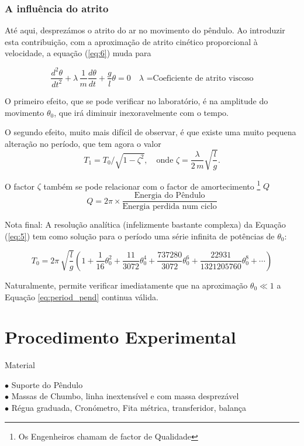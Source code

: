\documentclass[a4paper,twoside,12pt]{article}      %
\begin{document}
\subsubsection{A influência do atrito}
Até aqui, desprezámos o atrito do ar no movimento do pêndulo. Ao introduzir esta contribuição, com a aproximação de atrito cinético 
proporcional à velocidade, a  equação	(\ref{eq:6}) muda para

\begin{equation}
	 \frac{d^2 \theta}{dt^2} + \lambda \, \frac{1}{m}  \frac{d \theta}{dt} + \frac{g}{l} \theta =0 \quad \lambda \text{ =Coeficiente de atrito viscoso}
\end{equation}

O primeiro efeito, que se pode verificar no laboratório, é na amplitude do movimento $\theta_0$, que irá diminuir inexoravelmente com o tempo. 

O segundo efeito, muito mais difícil de observar, é que existe uma muito pequena alteração no período, que tem agora o valor
\begin{equation}
T_1= T_0 / \sqrt{1 - \zeta^2}, \quad \text{onde }  \zeta = \frac{\lambda}{2\, m} \sqrt{\frac{l}{g}} .
\end{equation}



O factor  $ \zeta $ também se pode relacionar com o factor de amortecimento \footnote{Os Engenheiros chamam de factor de Qualidade} $Q$ 
\begin{equation}
Q = 2 \pi \times \frac{\text{Energia do Pêndulo}}{\text{Energia perdida num ciclo}}
\end{equation}

Nota final: 
A resolução analítica (infelizmente bastante complexa) da Equação 	(\ref{eq:5})  tem como solução para o período uma série  infinita de potências de $\theta_0$:

\begin{equation}
	\label{eq:period_pend_exa}
T_0 =  2\pi\, \sqrt{\frac{l}{g}} \left(1 + \frac{1}{16} \theta_0^{2} + \frac{11}{3072} \theta_0^{4} +
 \frac{737280}{3072} \theta_0^{6} + \frac{22931}{1321205760} \theta_0^{8} + \cdots \right)
\end{equation}

Naturalmente, permite verificar imediatamente que na aproximação $\theta_0 \ll 1$ a Equação \ref{eq:period_pend} continua válida.

\newpage
\section{\sf Procedimento Experimental}
{ \large Material }
 \begin{flushleft}
	 $\bullet$ Suporte do Pêndulo \\
	 $\bullet$ Massas de Chumbo, linha inextensível e com massa desprezável \\
	 $\bullet$ Régua graduada, Cronómetro, Fita métrica, transferidor, balança
\end{flushleft} 
\end{document}
